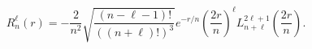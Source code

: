 \begin{equation}
R_{n}^{\ell }\left( r\right) =-\frac{2}{n^{2}}\sqrt{\frac{\left( n-\ell
-1\right) !}{\left( \left( n+\ell \right) !\right) ^{3}}}e^{-r/n}\left( 
\frac{2r}{n}\right) ^{\ell }L_{n+\ell }^{2\ell +1}\left( \frac{2r}{n}\right)
.
\end{equation}

